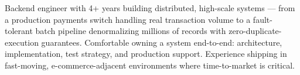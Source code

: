 

\begin{cvparagraph}

Backend engineer with 4+ years building distributed, high-scale systems — from a production payments switch handling real transaction volume to a fault-tolerant batch pipeline denormalizing millions of records with zero-duplicate-execution guarantees. Comfortable owning a system end-to-end: architecture, implementation, test strategy, and production support. Experience shipping in fast-moving, e-commerce-adjacent environments where time-to-market is critical.
\end{cvparagraph}